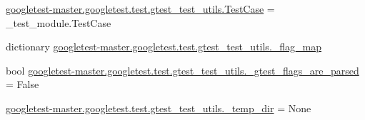 \begin{DoxyCompactItemize}
\item 
\mbox{\hyperlink{namespacegoogletest-master_1_1googletest_1_1test_1_1gtest__test__utils_a07aa51336528fd440633e31b91ad992a}{googletest-\/master.\+googletest.\+test.\+gtest\+\_\+test\+\_\+utils.\+Test\+Case}} = \+\_\+test\+\_\+module.\+Test\+Case
\item 
dictionary \mbox{\hyperlink{namespacegoogletest-master_1_1googletest_1_1test_1_1gtest__test__utils_a6fe9dc62e92fced22f9d2875e6d1aad8}{googletest-\/master.\+googletest.\+test.\+gtest\+\_\+test\+\_\+utils.\+\_\+flag\+\_\+map}}
\item 
bool \mbox{\hyperlink{namespacegoogletest-master_1_1googletest_1_1test_1_1gtest__test__utils_aa9474ff92ae907e92c30acd80da1a9b6}{googletest-\/master.\+googletest.\+test.\+gtest\+\_\+test\+\_\+utils.\+\_\+gtest\+\_\+flags\+\_\+are\+\_\+parsed}} = False
\item 
\mbox{\hyperlink{namespacegoogletest-master_1_1googletest_1_1test_1_1gtest__test__utils_aa7e6f23a561783e19f836a7ec7055f2b}{googletest-\/master.\+googletest.\+test.\+gtest\+\_\+test\+\_\+utils.\+\_\+temp\+\_\+dir}} = None
\end{DoxyCompactItemize}
